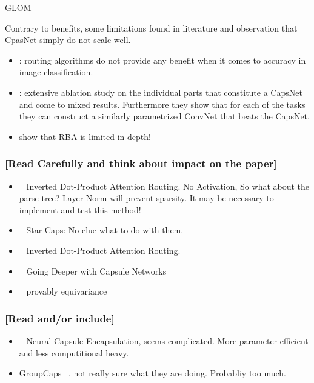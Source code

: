 \documentclass{article}
\begin{document}
GLOM ~\cite{corr/Hinton2021}

Contrary to benefits, some limitations found in literature and observation that CpasNet simply do not scale well.
\begin{itemize}
	\item \cite{acml/PaikKK19}: routing algorithms do not provide any benefit when it comes to accuracy in image classification.
	\item \cite{cvpr/GuT021}: extensive ablation study on the individual parts that constitute a CapsNet and come to mixed results. Furthermore they show that for each of the tasks they can construct a similarly parametrized ConvNet that beats the CapsNet.
	\item \cite{prl/PeerSR21} show that RBA is limited in depth!
\end{itemize}


\subsubsection*{[Read Carefully and think about impact on the paper]}
\begin{itemize}
	\item ~\cite{iclr/TsaiSGS20} Inverted Dot-Product Attention Routing. No Activation, So what about the parse-tree? Layer-Norm will prevent sparsity. It may be necessary to implement and test this method!
	\item ~\cite{nips/AhmedT19} Star-Caps: No clue what to do with them.
	\item ~\cite{iclr/TsaiSGS20} Inverted Dot-Product Attention Routing.
	\item ~\cite{cvpr/RajasegaranJJJS19} Going Deeper with Capsule Networks
	\item ~\cite{nips/LenssenFL18} provably equivariance
\end{itemize}

\subsubsection*{[Read and/or include]}
\begin{itemize}
	\item ~\cite{eccv/LiGDOW18} Neural Capsule Encapsulation, seems complicated. More parameter efficient and less computitional heavy.
	\item GroupCaps ~\cite{cvpr/ChenJSWS18}, not really sure what they are doing. Probabliy too much.
\end{itemize}
\end{document}
